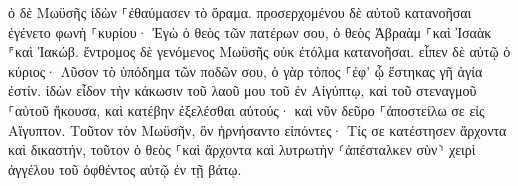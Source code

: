 \documentclass{openreader}
\begin{document}
ὁ δὲ Μωϋσῆς ἰδὼν ⸀ἐθαύμασεν τὸ ὅραμα. προσερχομένου δὲ αὐτοῦ κατανοῆσαι ἐγένετο φωνὴ ⸀κυρίου· 
Ἐγὼ ὁ θεὸς τῶν πατέρων σου, ὁ θεὸς Ἀβραὰμ ⸀καὶ Ἰσαὰκ ⸁καὶ Ἰακώβ. ἔντρομος δὲ γενόμενος Μωϋσῆς οὐκ ἐτόλμα κατανοῆσαι. 
εἶπεν δὲ αὐτῷ ὁ κύριος· Λῦσον τὸ ὑπόδημα τῶν ποδῶν σου, ὁ γὰρ τόπος ⸀ἐφ’ ᾧ ἕστηκας γῆ ἁγία ἐστίν. 
ἰδὼν εἶδον τὴν κάκωσιν τοῦ λαοῦ μου τοῦ ἐν Αἰγύπτῳ, καὶ τοῦ στεναγμοῦ ⸀αὐτοῦ ἤκουσα, καὶ κατέβην ἐξελέσθαι αὐτούς· καὶ νῦν δεῦρο ⸀ἀποστείλω σε εἰς Αἴγυπτον. 
Τοῦτον τὸν Μωϋσῆν, ὃν ἠρνήσαντο εἰπόντες· Τίς σε κατέστησεν ἄρχοντα καὶ δικαστήν, τοῦτον ὁ θεὸς ⸀καὶ ἄρχοντα καὶ λυτρωτὴν ⸂ἀπέσταλκεν σὺν⸃ χειρὶ ἀγγέλου τοῦ ὀφθέντος αὐτῷ ἐν τῇ βάτῳ. 
\end{document}
